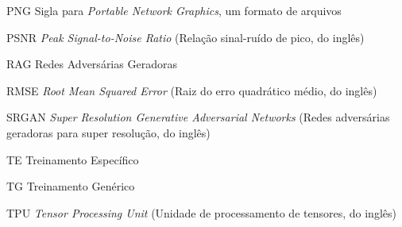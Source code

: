 \begin{siglas}
    \item[PNG]      Sigla para \textit{Portable Network Graphics}, um formato de arquivos
    \item[PSNR]     \textit{Peak Signal-to-Noise Ratio} (Relação sinal-ruído de pico, do inglês)
    \item[RAG]      Redes Adversárias Geradoras
    \item[RMSE]     \textit{Root Mean Squared Error} (Raiz do erro quadrático médio, do inglês)
    \item[SRGAN]    \textit{Super Resolution Generative Adversarial Networks} (Redes adversárias geradoras para super resolução, do inglês)
    \item[TE]       Treinamento Específico
    \item[TG]       Treinamento Genérico
    \item[TPU]      \textit{Tensor Processing Unit} (Unidade de processamento de tensores, do inglês)
\end{siglas}
